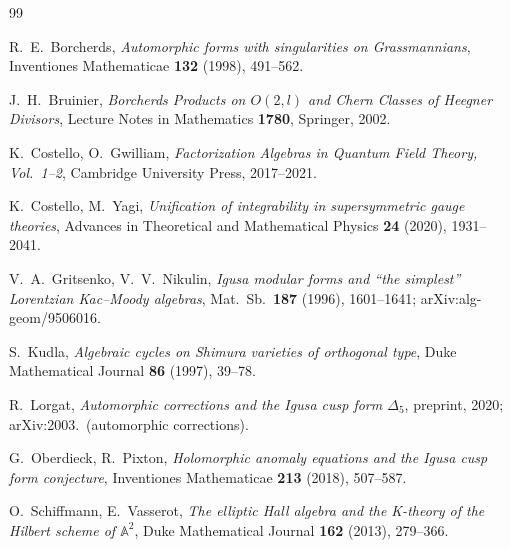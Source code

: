\documentclass[11pt]{amsart}
\theoremstyle{plain}
\theoremstyle{definition}
\theoremstyle{remark}
\begin{document}
\begin{thebibliography}{99}

R.~E.~Borcherds,
\emph{Automorphic forms with singularities on Grassmannians},
Inventiones Mathematicae \textbf{132} (1998), 491--562.

J.~H.~Bruinier,
\emph{Borcherds Products on $O(2,l)$ and Chern Classes of Heegner
Divisors},
Lecture Notes in Mathematics \textbf{1780}, Springer, 2002.

K.~Costello, O.~Gwilliam,
\emph{Factorization Algebras in Quantum Field Theory, Vol.~1--2},
Cambridge University Press, 2017--2021.

K.~Costello, M.~Yagi,
\emph{Unification of integrability in supersymmetric gauge theories},
Advances in Theoretical and Mathematical Physics \textbf{24} (2020),
1931--2041.

V.~A.~Gritsenko, V.~V.~Nikulin,
\emph{Igusa modular forms and ``the simplest'' Lorentzian Kac--Moody
algebras},
Mat.\ Sb.\ \textbf{187} (1996), 1601--1641; arXiv:alg-geom/9506016.

S.~Kudla,
\emph{Algebraic cycles on Shimura varieties of orthogonal type},
Duke Mathematical Journal \textbf{86} (1997), 39--78.

R.~Lorgat,
\emph{Automorphic corrections and the Igusa cusp form $\Delta_{5}$},
preprint, 2020; arXiv:2003.~(automorphic corrections).

G.~Oberdieck, R.~Pixton,
\emph{Holomorphic anomaly equations and the Igusa cusp form conjecture},
Inventiones Mathematicae \textbf{213} (2018), 507--587.

O.~Schiffmann, E.~Vasserot,
\emph{The elliptic Hall algebra and the K-theory of the Hilbert scheme
of $\mathbb{A}^{2}$},
Duke Mathematical Journal \textbf{162} (2013), 279--366.

\end{thebibliography}
\end{document}

